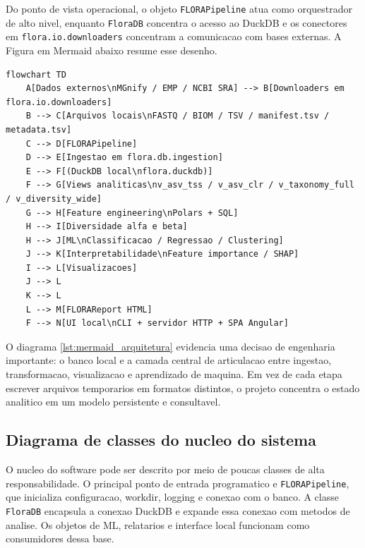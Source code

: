 \documentclass[12pt,a4paper]{article}
\begin{document}
Do ponto de vista operacional, o objeto \texttt{FLORAPipeline} atua como orquestrador de alto nivel, enquanto \texttt{FloraDB} concentra o acesso ao DuckDB e os conectores em \texttt{flora.io.downloaders} concentram a comunicacao com bases externas. A Figura em Mermaid abaixo resume esse desenho.

\begin{lstlisting}[style=mermaid,caption={Diagrama Mermaid de alto nivel da arquitetura do FLORA.},label={lst:mermaid_arquitetura}]
flowchart TD
    A[Dados externos\nMGnify / EMP / NCBI SRA] --> B[Downloaders em flora.io.downloaders]
    B --> C[Arquivos locais\nFASTQ / BIOM / TSV / manifest.tsv / metadata.tsv]
    C --> D[FLORAPipeline]
    D --> E[Ingestao em flora.db.ingestion]
    E --> F[(DuckDB local\nflora.duckdb)]
    F --> G[Views analiticas\nv_asv_tss / v_asv_clr / v_taxonomy_full / v_diversity_wide]
    G --> H[Feature engineering\nPolars + SQL]
    H --> I[Diversidade alfa e beta]
    H --> J[ML\nClassificacao / Regressao / Clustering]
    J --> K[Interpretabilidade\nFeature importance / SHAP]
    I --> L[Visualizacoes]
    J --> L
    K --> L
    L --> M[FLORAReport HTML]
    F --> N[UI local\nCLI + servidor HTTP + SPA Angular]
\end{lstlisting}

O diagrama \ref{lst:mermaid_arquitetura} evidencia uma decisao de engenharia importante: o banco local e a camada central de articulacao entre ingestao, transformacao, visualizacao e aprendizado de maquina. Em vez de cada etapa escrever arquivos temporarios em formatos distintos, o projeto concentra o estado analitico em um modelo persistente e consultavel.

\subsection{Diagrama de classes do nucleo do sistema}

O nucleo do software pode ser descrito por meio de poucas classes de alta responsabilidade. O principal ponto de entrada programatico e \texttt{FLORAPipeline}, que inicializa configuracao, workdir, logging e conexao com o banco. A classe \texttt{FloraDB} encapsula a conexao DuckDB e expande essa conexao com metodos de analise. Os objetos de ML, relatarios e interface local funcionam como consumidores dessa base.
\end{document}
